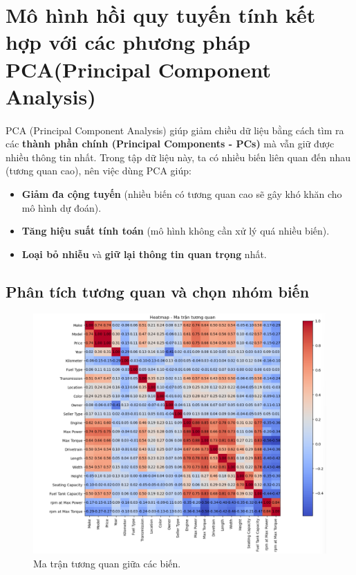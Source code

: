 \newpage
\section{Mô hình hồi quy tuyến tính kết hợp với các phương pháp PCA(Principal Component Analysis)}

\paragraph{}{PCA (Principal Component Analysis) giúp giảm chiều dữ liệu bằng cách tìm ra các \textbf{thành phần chính (Principal Components - PCs)} mà vẫn giữ được nhiều thông tin nhất. Trong tập dữ liệu này, ta có nhiều biến liên quan đến nhau (tương quan cao), nên việc dùng PCA giúp:}

\begin{itemize}
    \item \textbf{Giảm đa cộng tuyến} (nhiều biến có tương quan cao sẽ gây khó khăn cho mô hình dự đoán).
    \item \textbf{Tăng hiệu suất tính toán} (mô hình không cần xử lý quá nhiều biến).
    \item \textbf{Loại bỏ nhiễu} và \textbf{giữ lại thông tin quan trọng} nhất.
\end{itemize}

\subsection{Phân tích tương quan và chọn nhóm biến}
\label{subsec:correlation}

\begin{figure}[H] 
    \centering
    \includegraphics[width=1\textwidth]{img/heatmapPCA.png} 
    \caption{Ma trận tương quan giữa các biến.}
    \label{fig:correlation_matrix}
\end{figure}

